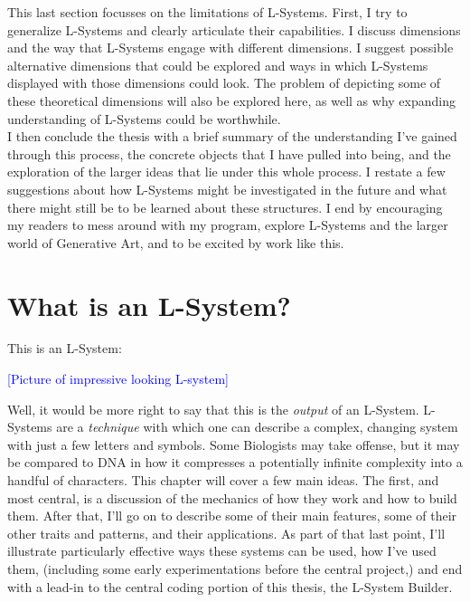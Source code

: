 \documentclass[12pt,twoside]{reedthesis}
\begin{document}
	This last section focusses on the limitations of L-Systems. First, I try to generalize L-Systems and clearly articulate their capabilities. I discuss dimensions and the way that L-Systems engage with different dimensions. I suggest possible alternative dimensions that could be explored and ways in which L-Systems displayed with those dimensions could look. The problem of depicting some of these theoretical dimensions will also be explored here, as well as why expanding understanding of L-Systems could be worthwhile.\\
	
	I then conclude the thesis with a brief summary of the understanding I've gained through this process, the concrete objects that I have pulled into being, and the exploration of the larger ideas that lie under this whole process. I restate a few suggestions about how L-Systems might be investigated in the future and what there might still be to be learned about these structures. I end by encouraging my readers to mess around with my program, explore L-Systems and the larger world of Generative Art, and to be excited by work like this.\\
	
	
\chapter{What is an L-System?}

This is an L-System:

\textcolor{blue}{[Picture of impressive looking L-system]}

	Well, it would be more right to say that this is the \textit{output} of an L-System. L-Systems are a \textit{technique} with which one can describe a complex, changing system with just a few letters and symbols. Some Biologists may take offense, but it may be compared to DNA in how it compresses a potentially infinite complexity into a handful of characters. This chapter will cover a few main ideas. The first, and most central, is a discussion of the mechanics of how they work and how to build them. After that, I’ll go on to describe some of their main features, some of their other traits and patterns, and their applications. As part of that last point, I’ll illustrate particularly effective ways these systems can be used, how I’ve used them, (including some early experimentations before the central project,) and end with a lead-in to the central coding portion of this thesis, the L-System Builder.\\
\end{document}
